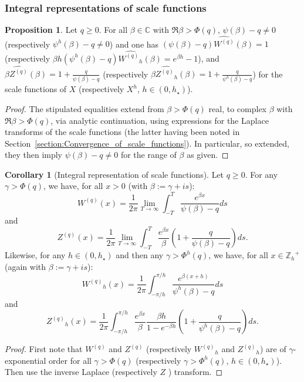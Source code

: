 \documentclass[pdftex,oneside,11pt,reqno]{amsart}
\theoremstyle{definition}
\theoremstyle{theorem}
\newtheorem{proposition}{Proposition}[section]
\newtheorem{corollary}{Corollary}[section]
\theoremstyle{remark}
\numberwithin{equation}{section}
\numberwithin{definition}{section}
\begin{document}
\subsubsection{Integral representations of scale
functions}\label{subsubsection:integral_representations}

\begin{proposition}\label{proposition:well-posedness}
Let $q\geq 0$. For all $\beta\in\mathbb{C}$ with $\Re\beta>\Phi(q)$, $\psi(\beta)-q\ne 0$ (respectively $\psi^h(\beta)-q\ne 0$) and one has $(\psi(\beta)-q)\widehat{W^{(q)}}(\beta)=1$ (respectively $\beta h(\psi^h(\beta)-q)\widehat{{W^{(q)}}_h}(\beta)=e^{\beta h}-1$), and  $\beta \widehat{Z^{(q)}}(\beta)=1+\frac{q}{\psi(\beta)-q}$ (respectively $\beta \widehat{{Z^{(q)}}_h}(\beta)=1+\frac{q}{\psi^h(\beta)-q}$) for the scale functions of $X$ (respectively $X^h$, $h\in (0,h_\star)$). 
\end{proposition}
\begin{proof}
The stipulated equalities extend from $\beta>\Phi(q)$ real, to complex $\beta$ with  $\Re\beta>\Phi(q)$, via analytic continuation, using expressions for the Laplace transforms of the scale functions (the latter having been noted in Section~\ref{section:Convergence_of_scale_functions}). In particular, so extended, they then imply $\psi(\beta)-q\ne 0$ for the range of $\beta$ as given.
\end{proof}

\begin{corollary}[Integral representation of scale functions]\label{corollary:scale_fncs_laplace-transforms}
Let $q\geq 0$. For any $\gamma>\Phi(q)$, we have, for all $x>0$ (with $\beta:=\gamma+is$): 
\begin{equation}\label{eq:integral_represantation_Wq}
{W^{(q)}}(x)=\frac{1}{2\pi}\lim_{T\to\infty}\int_{-T}^T\frac{e^{\beta x}}{\psi(\beta)-q}ds
\end{equation}
and 
\begin{equation}
{Z^{(q)}}(x)=\frac{1}{2\pi}\lim_{T\to\infty}\int_{-T}^T\frac{e^{\beta x}}{\beta}\left(1+\frac{q}{\psi(\beta)-q}\right)ds.
\end{equation}
Likewise, for any $h\in (0,h_\star)$ and then any $\gamma>\Phi^h(q)$, we have, for all $x\in {\mathbb{Z}_h}^+$ (again with $\beta:=\gamma+is$):
\begin{equation}\label{eq:integral_represantation_Wqh}
{W^{(q)}}_h(x)=\frac{1}{2\pi}\int_{-\pi/h}^{\pi/h}\frac{e^{\beta (x+h)}}{\psi^h(\beta)-q}ds
\end{equation}
and 
\begin{equation}
{Z^{(q)}}_h(x)=\frac{1}{2\pi}\int_{-\pi/h}^{\pi/h}\frac{e^{\beta x}}{\beta}\frac{\beta h}{1-e^{-\beta h}}\left(1+\frac{q}{\psi^h(\beta)-q}\right)ds.
\end{equation}
\end{corollary}
\begin{proof}
First note that  ${W^{(q)}}$ and ${Z^{(q)}}$ (respectively ${W^{(q)}}_h$ and ${Z^{(q)}}_h$) are of $\gamma$-exponential order for all $\gamma>\Phi(q)$ (respectively $\gamma>\Phi^h(q)$, $h\in (0,h_\star)$). Then use the inverse Laplace \cite[Section 3.3]{davies} (respectively $Z$ \cite[p. 11]{jury}) transform.
\end{proof}
\end{document}
